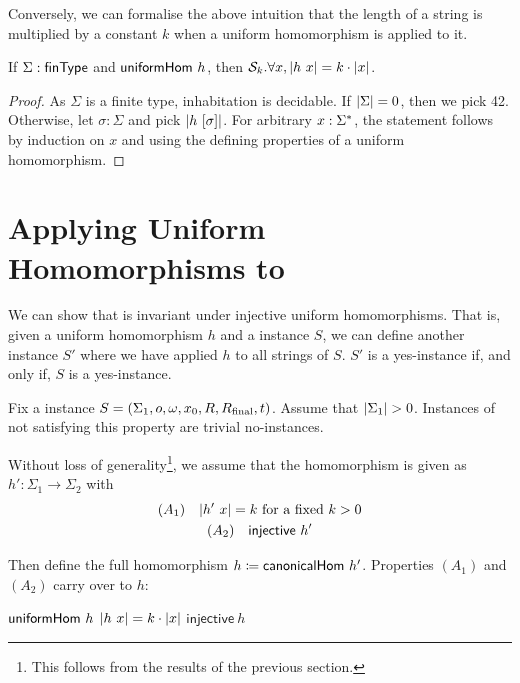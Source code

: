 Conversely, we can formalise the above intuition that the length of a string is multiplied by a constant $k$ when a uniform homomorphism is applied to it.
\begin{lemma}
  If $\Sigma : \textsf{finType}$ and $\textsf{uniformHom}~h$, then $\mathcal{S}_{k}. \forall x, |h~x| = k \cdot |x|$. 
\end{lemma}
\begin{proof}
  As $\Sigma$ is a finite type, inhabitation is decidable. If $|\Sigma| = 0$, then we pick 42. 
  Otherwise, let $\sigma : \Sigma$ and pick $|h~[\sigma]|$. 
  For arbitrary $x : \Sigma^*$, the statement follows by induction on $x$ and using the defining properties of a uniform homomorphism.
\end{proof}

\section{Applying Uniform Homomorphisms to \PR{}}\label{sec:unif_hom_pr}
We can show that \PR{} is invariant under injective uniform homomorphisms. That is, given a uniform homomorphism $h$ and a \PR{} instance $S$, we can define another \PR{} instance $S'$ where we have applied $h$ to all strings of $S$. $S'$ is a yes-instance if, and only if, $S$ is a yes-instance. 

Fix a \PR{} instance $S = (\Sigma_1, o, \omega, x_0, R, R_{\text{final}}, t)$. 
Assume that $|\Sigma_1| > 0$. Instances of \PR{} not satisfying this property are trivial no-instances. 

Without loss of generality\footnote{This follows from the results of the previous section.}, we assume that the homomorphism is given as $h' : \Sigma_1 \rightarrow \Sigma_2$ with 
\begin{gather*}
  (A_1) \quad |h'~x| = k~\text{for a fixed } k > 0 \\
  (A_2) \quad \textsf{injective}~h'
\end{gather*}

Then define the full homomorphism $h \coloneqq \textsf{canonicalHom}~h'$. 
Properties $(A_1)$ and $(A_2)$ carry over to $h$:
\begin{proposition}\label{prop:h_properties}\leavevmode
  \begin{enumerate}
    \coqitem[h_unifHom] $\textsf{uniformHom}~h$
    \coqitem[h_multiplier] $|h~x| = k \cdot |x|$
    \coqitem[h_injective] $\textsf{injective}~h$
  \end{enumerate}
\end{proposition}

